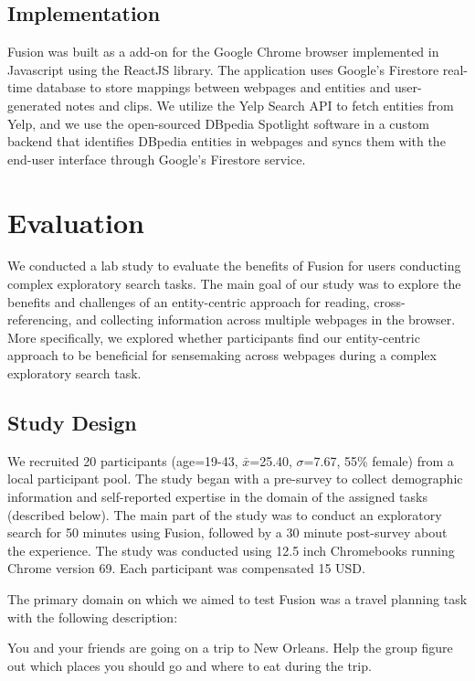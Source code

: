 \subsection{Implementation}

Fusion was built as a add-on for the Google Chrome browser implemented in Javascript using the ReactJS library. The application uses Google's Firestore real-time database to store mappings between webpages and entities and user-generated notes and clips. We utilize the Yelp Search API to fetch entities from Yelp, and we use the open-sourced DBpedia Spotlight \cite{spotlight} software in a custom backend that identifies DBpedia entities \cite{dbpedia} in webpages and syncs them with the end-user interface through Google's Firestore service.

\section{Evaluation}
We conducted a lab study to evaluate the benefits of Fusion for users conducting complex exploratory search tasks. The main goal of our study was to explore the benefits and challenges of an entity-centric approach for reading, cross-referencing, and collecting information across multiple webpages in the browser. More specifically, we explored whether participants find our entity-centric approach to be beneficial for sensemaking across webpages during a complex exploratory search task. 

\subsection{Study Design}
We recruited 20 participants (age=19-43, $\bar{x}$=25.40, $\sigma$=7.67, 55\% female) from a local participant pool. The study began with a pre-survey to collect demographic information and self-reported expertise in the domain of the assigned tasks (described below). The main part of the study was to conduct an exploratory search for 50 minutes using Fusion, followed by a 30 minute post-survey about the experience. The study was conducted using 12.5 inch Chromebooks running Chrome version 69. Each participant was compensated 15 USD. 

The primary domain on which we aimed to test Fusion was a travel planning task with the following description:

    \begin{tightquote}
You and your friends are going on a trip to New Orleans. Help the group figure out which places you should go and where to eat during the trip. 
    \end{tightquote}

